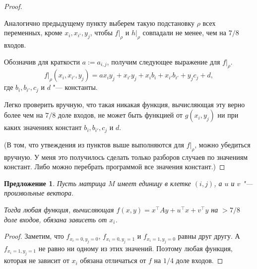 \documentclass[oneside, a4paper]{article}
\newtheorem{proposition}{Предложение}
\theoremstyle{definition}
\theoremstyle{remark}
\begin{document}
\begin{proof}
\begin{description}
Аналогично предыдущему пункту выберем такую подстановку $\rho$ всех переменных,
кроме $x_i, x_{i'}, y_j$, чтобы $f \rvert _ \rho$ и $h \rvert _ \rho$ совпадали
не менее, чем на $7/8$ входов.

Обозначив для краткости $a := a_{i, j}$, получим следующее выражение для $f
\rvert _ \rho$.
\[
f \rvert _ \rho (x_i, x_{i'}, y_j) = a x_i y_j + x_{i'} y_j + x_i b_i + x_{i'} b_{i'} + y_j c_j + d,
\]
где $b_{i}, b_{i'}, c_j$ и $d$ "--- константы.

Легко проверить вручную, что такая никакая функция, вычисляющая эту верно более
чем на $7/8$ доле входов, не может быть функцией от $g(x_i, y_j)$ ни при каких
значениях констант $b_{i}, b_{i'}, c_j$ и $d$.
\end{description}

(В том, что утвеждения из пунктов выше выполняются для $f \rvert _ \rho$, можно
убедиться вручную. У меня это получилось сделать только разборов случаев по
значениям констант. Либо можно перебрать программой все значения констант.)
\end{proof}

\begin{proposition} \label{single_one}
Пусть матрица $M$ имеет единицу в клетке $(i, j)$, а $u$ и $v$ "--- произвольные
вектора.

Тогда любая функция, вычисляющая $f(x, y) = x^\top A y + u^\top x + v^\top y$ на
$> 7/8$ доле входов, обязана зависеть от $x_i$.
\end{proposition}
\begin{proof}
Заметим, что $f_{x_i = 0, y_j = 0}$, $f_{x_i = 0, y_j = 1}$ и $f_{x_i = 1, y_j =
0}$ равны друг другу. А $f_{x_i = 1, y_j = 1}$ не равно ни одному из этих значений.
Поэтому любая функция, которая не зависит от $x_i$ обязана отличаться от $f$ на
$1/4$ доле входов.
\end{proof}
\end{document}
